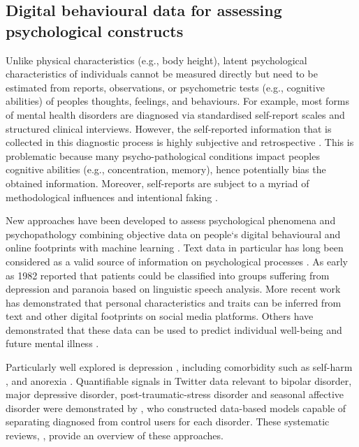 \documentclass[11pt,theapa]{article}
\theoremstyle{plain}
\begin{document}
\subsection{Digital behavioural data for assessing psychological constructs}\label{sec:digbehdat}
Unlike physical characteristics (e.g., body height), latent psychological characteristics of individuals cannot be measured directly but need to be estimated from reports, observations, or psychometric tests (e.g., cognitive abilities) of peoples thoughts, feelings, and behaviours. For example, most forms of mental health disorders are diagnosed via standardised self-report scales and structured clinical interviews. However, the self-reported information that is collected in this diagnostic process is highly subjective and retrospective \cite{martin1990mental}. This is problematic because many psycho-pathological conditions impact peoples cognitive abilities (e.g., concentration, memory), hence potentially bias the obtained information. Moreover, self-reports are subject to a myriad of methodological influences \cite{Vaerenbergh2013} and intentional faking \cite{Goerigk2020}.

New approaches have been developed to assess psychological phenomena and psychopathology combining objective data on people`s digital behavioural and online footprints with machine learning \cite{Insel2017,Stachl2021PS}. Text data in particular has long been considered as a valid source of information on psychological processes \cite{Allport1942}. As early as 1982  \cite{oxman1982language} reported that patients could be classified into groups suffering from depression and paranoia based on linguistic speech analysis. More recent work \cite{Azucar2018,Kosinski2013} has demonstrated that personal characteristics and traits can be inferred from text and other digital footprints on social media platforms. Others have demonstrated that these data can be used to predict individual well-being \cite{Schwartz2016PredictingIW} and future mental illness \cite{thorstad2019predicting}. 

Particularly well explored is depression \cite{de2013predicting,schwartz2014towards,orabi2018deep,facebook_depression2018,tadesse2019detection,arabic_depression2020}, including comorbidity such as self-harm \cite{Yates2017DepressionAS}, and anorexia \cite{ramiirez2018upf}. Quantifiable signals in Twitter data relevant to bipolar disorder, major depressive disorder, post-traumatic-stress disorder and seasonal affective disorder were demonstrated by \cite{coppersmith2014quantifying}, who constructed data-based models capable of separating diagnosed from control users for each disorder. These systematic reviews, \cite{wongkoblap2017researching,aboureihanimohammadi2020identification,10.1145/3398069}, provide an overview of these approaches.
\end{document}

